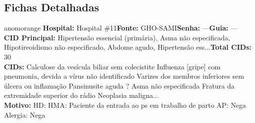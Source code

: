 \documentclass[a4paper,10pt]{article}
\begin{document}
\subsection{Fichas Detalhadas}
\begin{anomalycard}[Interna\c{c}\~{a}o \#2138 | Pac. \#1974 | ALTO (z=4.46) | LOS: 12d | 11/03/2026\,$\to$\,—]{anomorange}
\textbf{Hospital:} Hospital \#11\quad \textbf{Fonte:} GHO-SAMI\quad \textbf{Senha:} ---\quad \textbf{Guia:} ---\\

\textbf{CID Principal:} {\small Hipertensão essencial (primária), Asma não especificada, Hipotireoidismo não especificado, Abdome agudo, Hipertensão ess...}\quad\textbf{Total CIDs:} 30\\

\textbf{CIDs:} {\scriptsize Calculose da vesícula biliar sem colecistite \textbar{} Influenza [gripe] com pneumonia, devida a vírus não identificado \textbar{} Varizes dos membros inferiores sem úlcera ou inflamação \textbar{} Pansinusite aguda \textbar{} ? \textbar{} Asma não especificada \textbar{} Fratura da extremidade superior do rádio \textbar{} Neoplasia maligna...}\\

\textbf{Motivo:} {\scriptsize HD:  HMA: Paciente da entrada ao ps em trabalho de parto  AP: Nega  Alergia: Nega}\\

\end{anomalycard}
\end{document}
